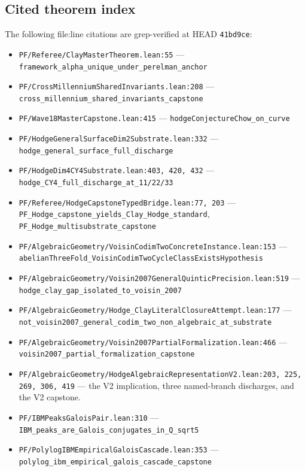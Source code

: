 \documentclass[11pt,a4paper]{article}
\theoremstyle{plain}
\theoremstyle{definition}
\begin{document}
\subsection{Cited theorem index}

The following file:line citations are grep-verified at HEAD
\texttt{41bd9ce}:

\begin{itemize}[leftmargin=*]
\item
\texttt{PF/Referee/ClayMasterTheorem.lean:55} ---
\texttt{framework\_alpha\_unique\_under\_perelman\_anchor}

\item
\texttt{PF/CrossMillenniumSharedInvariants.lean:208} ---
\texttt{cross\_millennium\_shared\_invariants\_capstone}

\item
\texttt{PF/Wave18MasterCapstone.lean:415} ---
\texttt{hodgeConjectureChow\_on\_curve}

\item
\texttt{PF/HodgeGeneralSurfaceDim2Substrate.lean:332} ---
\texttt{hodge\_general\_surface\_full\_discharge}

\item
\texttt{PF/HodgeDim4CY4Substrate.lean:403, 420, 432} ---
\texttt{hodge\_CY4\_full\_discharge\_at\_11/22/33}

\item
\texttt{PF/Referee/HodgeCapstoneTypedBridge.lean:77, 203} ---
\texttt{PF\_Hodge\_capstone\_yields\_Clay\_Hodge\_standard},
\texttt{PF\_Hodge\_multisubstrate\_capstone}

\item
\texttt{PF/AlgebraicGeometry/VoisinCodimTwoConcreteInstance.lean:153}
--- \texttt{abelianThreeFold\_VoisinCodimTwoCycleClassExistsHypothesis}

\item
\texttt{PF/AlgebraicGeometry/Voisin2007GeneralQuinticPrecision.lean:519}
--- \texttt{hodge\_clay\_gap\_isolated\_to\_voisin\_2007}

\item
\texttt{PF/AlgebraicGeometry/Hodge\_ClayLiteralClosureAttempt.lean:177}
--- \texttt{not\_voisin2007\_general\_codim\_two\_non\_algebraic\_at\_substrate}

\item
\texttt{PF/AlgebraicGeometry/Voisin2007PartialFormalization.lean:466}
--- \texttt{voisin2007\_partial\_formalization\_capstone}

\item
\texttt{PF/AlgebraicGeometry/HodgeAlgebraicRepresentationV2.lean:203,
225, 269, 306, 419} --- the V2 implication, three named-branch
discharges, and the V2 capstone.

\item
\texttt{PF/IBMPeaksGaloisPair.lean:310} ---
\texttt{IBM\_peaks\_are\_Galois\_conjugates\_in\_Q\_sqrt5}

\item
\texttt{PF/PolylogIBMEmpiricalGaloisCascade.lean:353} ---
\texttt{polylog\_ibm\_empirical\_galois\_cascade\_capstone}
\end{itemize}
\end{document}

